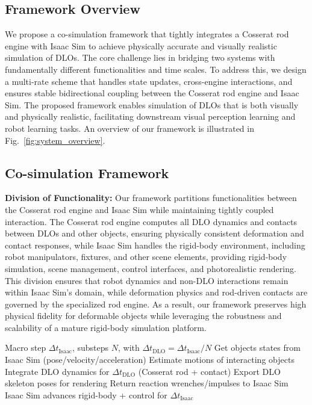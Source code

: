 \documentclass[letterpaper, 10 pt, conference]{ieeeconf}  %
\begin{document}
\subsection{Framework Overview}
We propose a co-simulation framework that tightly integrates a Cosserat rod engine with Isaac Sim to achieve physically accurate and visually realistic simulation of DLOs. The core challenge lies in bridging two systems with fundamentally different functionalities and time scales. To address this, we design a multi-rate scheme that handles state updates, cross-engine interactions, and ensures stable bidirectional coupling between the Cosserat rod engine and Isaac Sim. The proposed framework enables simulation of DLOs that is both visually and physically realistic, facilitating downstream visual perception learning and robot learning tasks. An overview of our framework is illustrated in Fig.~\ref{fig:system_overview}.



\subsection{Co-simulation Framework}
\noindent\textbf{Division of Functionality:} Our framework partitions functionalities between the Cosserat rod engine and Isaac Sim while maintaining tightly coupled interaction. The Cosserat rod engine computes all DLO dynamics and contacts between DLOs and other objects, ensuring physically consistent deformation and contact responses, while Isaac Sim handles the rigid-body environment, including robot manipulators, fixtures, and other scene elements, providing rigid-body simulation, scene management, control interfaces, and photorealistic rendering. This division ensures that robot dynamics and non-DLO interactions remain within Isaac Sim's domain, while deformation physics and rod-driven contacts are governed by the specialized rod engine. As a result, our framework preserves high physical fidelity for deformable objects while leveraging the robustness and scalability of a mature rigid-body simulation platform.



\begin{algorithm}[t]\RaggedRight
\caption{Multi-rate co-simulation}
\label{alg:cosim}
\begin{algorithmic}[1]
\Require Macro step $\Delta t_{\mathrm{Isaac}}$, substeps $N$, with $\Delta t_{\mathrm{DLO}}=\Delta t_{\mathrm{Isaac}}/N$
    \State Get objects states from Isaac Sim
    \Statex \hspace{\algorithmicindent} (pose/velocity/acceleration)
        \State Estimate motions of interacting objects
        \State Integrate DLO dynamics for $\Delta t_{\mathrm{DLO}}$
        \Statex \hspace{\algorithmicindent} (Cosserat rod + contact)
    \EndFor
    \State Export DLO skeleton poses for rendering
    \State Return reaction wrenches/impulses to Isaac Sim
    \State Isaac Sim advances rigid-body + control for $\Delta t_{\mathrm{Isaac}}$
\EndFor
\end{algorithmic}
\end{algorithm}
\end{document}

